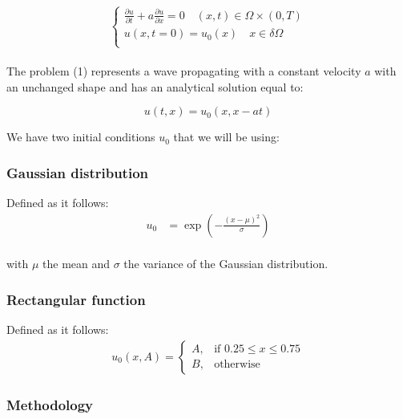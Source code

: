 \documentclass{article}
\begin{document}
\begin{equation}
    \begin{cases}
    \frac{\partial u}{\partial t} + a \frac{\partial u}{\partial x} = 0 \quad (x,t) \in \Omega \times (0,T) \\
     u(x,t=0) = u_0(x) \quad x \in \delta \Omega \\
    \end{cases}
\end{equation}
\\
The problem (1) represents a wave propagating with a constant velocity $a$ with an unchanged shape and has an analytical solution equal to: 

$$
u(t, x)=u_0(x, x-at)
$$

We have two initial conditions $u_0$ that we will be using:  
\subsubsection*{Gaussian distribution}

Defined as it follows:
\begin{align*}
    u_0 &= \exp\left(-\frac{(x - \mu)^2}{\sigma}\right)
\end{align*}
\\
with $\mu$ the mean and $\sigma$ the variance of the Gaussian distribution.

\subsubsection*{Rectangular function}

Defined as it follows:
\begin{align*}
    u_0(x, A) = \begin{cases}
    A, & \text{if } 0.25 \leq x \leq 0.75 \\
    B, & \text{otherwise}
    \end{cases}
\end{align*}



\subsubsection{Methodology}
\end{document}
